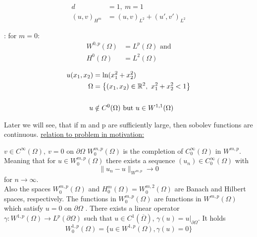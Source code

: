 \begin{example}
	\begin{align*}
		d&=1,\ m=1\\
		(u,v)_{H^m} &= (u,v)_{L^2} + (u',v')_{L^2}
	\end{align*} 
\end{example}

 
\begin{remark}: for $m=0$:
	\begin{align*}
		W^{0,p}(\Omega) &= L^p(\Omega) \text{ and} \\H^0(\Omega) &= L^2(\Omega)
	\end{align*} 
\end{remark}

\begin{example}
	\begin{align*}
	u(x_1,x_2) &= \text{ln}(x^2_1 + x^2_2)\\
	\Omega &= \big \{  (x_1,x_2)\in\mathbb{R}^2,\ x^2_1 + x^2_2 < 1    \big \} \\
	& \\
	u &\notin C^0(\Omega) \text{ but } u \in W^{1,1}(\Omega)
	\end{align*}
\end{example}
 
Later we will see, that if m and p are sufficiently large, then sobolev functions are continuous.\nl
\underline{relation to problem in motivation:}

%
%
%
%
%

\par
\glqq $v \in C^\infty(\Omega),\ v=0 \text{ on } \partial\Omega$ \grqq \enter
$W^{m,p}_0(\Omega)$ is the completion of $C^\infty_0(\Omega)$ in $ W^{m,p} $. Meaning that for $u \in W^{m,p}_0(\Omega)$ there exists a sequence $(u_n) \in C^\infty_0(\Omega)$ with 
\begin{equation*}
	\|u_n - u\|_{W^{m,p}} \to 0
\end{equation*}
for $n \to \infty$.\\
Also the spaces $W^{m,p}_0(\Omega)$ and $H^m_0(\Omega) = W^{m,2}_0(\Omega)$ are Banach and Hilbert spaces, respectively. The functions in $W^{m,p}_0(\Omega)$ are functions in $W^{m,p}(\Omega)$ which satisfy \glqq $u =0$ on $\partial \Omega$ \grqq.\nl
There exists a linear operator $\gamma: W^{1,p}(\Omega) \to L^p(\partial\Omega)$ such that $u \in C^1(\overline{\Omega})$, $\gamma(u) = u|_{\partial \Omega}$. It holds 
\begin{equation*}
	W^{1,p}_0(\Omega) = \big \{ u \in W^{1,p}(\Omega), \gamma(u) = 0 \big \}
\end{equation*}

